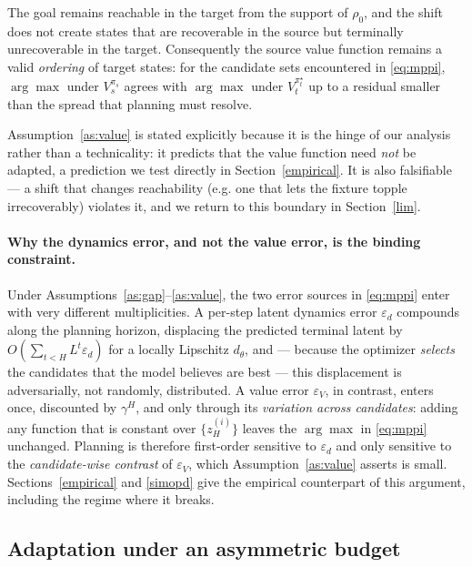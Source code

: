 \begin{assumption}
\label{as:value}
The goal remains reachable in the target from the support of $\rho_0$, and the
shift does not create states that are recoverable in the source but terminally
unrecoverable in the target. Consequently the source value function remains a
valid \emph{ordering} of target states: for the candidate sets encountered in
\eqref{eq:mppi}, $\arg\max$ under $V^{\pi_s}_{s}$ agrees with
$\arg\max$ under $V^{\pi_t^\star}_{t}$ up to a residual smaller
than the spread that planning must resolve.
\end{assumption}

Assumption~\ref{as:value} is stated explicitly because it is the hinge of our
analysis rather than a technicality: it predicts that the value function need
\emph{not} be adapted, a prediction we test directly in
Section~\ref{empirical}. It is also falsifiable --- a shift that changes
reachability (e.g. one that lets the fixture topple irrecoverably) violates it,
and we return to this boundary in Section~\ref{lim}.

\paragraph{Why the dynamics error, and not the value error, is the binding
constraint.} Under Assumptions~\ref{as:gap}--\ref{as:value}, the two error
sources in \eqref{eq:mppi} enter with very different multiplicities. A
per-step latent dynamics error $\varepsilon_d$ compounds along the planning
horizon, displacing the predicted terminal latent by $O(\sum_{t<H} L^{t}
\varepsilon_d)$ for a locally Lipschitz $d_\theta$, and --- because the
optimizer \emph{selects} the candidates that the model believes are best ---
this displacement is adversarially, not randomly, distributed. A value error
$\varepsilon_V$, in contrast, enters once, discounted by $\gamma^{H}$, and only
through its \emph{variation across candidates}: adding any function that is
constant over $\{z_H^{(i)}\}$ leaves the $\arg\max$ in \eqref{eq:mppi}
unchanged. Planning is therefore first-order sensitive to $\varepsilon_d$ and
only sensitive to the \emph{candidate-wise contrast} of $\varepsilon_V$, which
Assumption~\ref{as:value} asserts is small. Sections~\ref{empirical} and
\ref{simopd} give the empirical counterpart of this argument, including the
regime where it breaks.

\subsection{Adaptation under an asymmetric budget}

